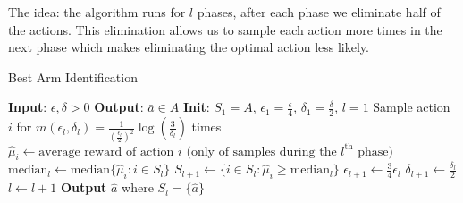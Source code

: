The idea: the algorithm runs for $l$ phases, after each phase we
eliminate half of the actions. This elimination allows us to sample
each action more times in the next phase which makes eliminating the
optimal action less likely.

















\begin{algorithm}
\caption{Best Arm Identification}
\begin{algorithmic}[1]
\State \textbf{Input}: $\epsilon, \delta > 0$
\State \textbf{Output}: $\bar{a} \in A$
\State \textbf{Init}: $S_{1} = A$, $\epsilon_{1} = \frac{\epsilon}{4}$, $\delta_{1} = \frac{\delta}{2}$, $l = 1$
\Repeat
        \State Sample action $i$ for $m(\epsilon_l, \delta_l) = \frac{1}{\left(\frac{\epsilon_{l}}{2}\right)^2} \log \left(\frac{3}{\delta_{l}}\right)$ times
        \State $\hat{\mu}_{i} \leftarrow \text{average reward of action } i \text{ (only of samples during the } l^{\text{th}} \text{ phase)}$
    \EndFor
    \State $\text{median}_{l} \leftarrow \text{median} \{ \hat{\mu}_{i} : i \in S_{l} \}$
    \State $S_{l+1} \leftarrow \{ i \in S_{l} : \hat{\mu}_{i} \geq \text{median}_{l} \}$
    \State $\epsilon_{l+1} \leftarrow \frac{3}{4} \epsilon_{l}$
    \State $\delta_{l+1} \leftarrow \frac{\delta_{l}}{2}$
    \State $l \leftarrow l + 1$
\State \textbf{Output} $\hat{a}$ where $S_l = \{\hat{a}\}$
\end{algorithmic}
\end{algorithm}

